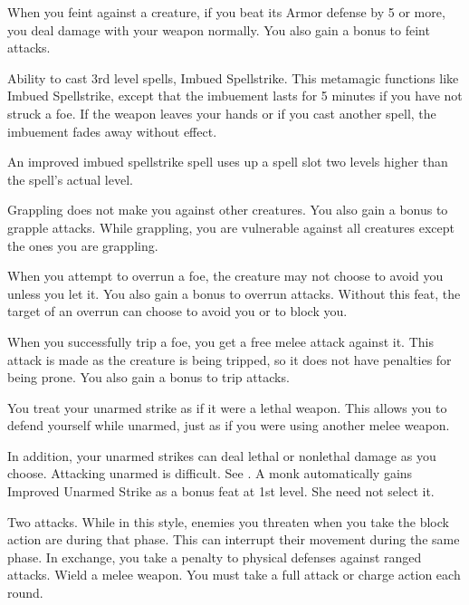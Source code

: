 \featben When you feint against a creature, if you beat its Armor defense by 5 or more, you deal damage with your weapon normally.
You also gain a  bonus to feint attacks.

\featpre Ability to cast 3rd level spells, Imbued Spellstrike.
\featben This metamagic functions like Imbued Spellstrike, except that the imbuement lasts for 5 minutes if you have not struck a foe.
If the weapon leaves your hands or if you cast another spell, the imbuement fades away without effect.

An improved imbued spellstrike spell uses up a spell slot two levels higher than the spell's actual level.

\featben Grappling does not make you \vulnerable against other creatures.
You also gain a  bonus to grapple attacks.
While grappling, you are vulnerable against all creatures except the ones you are grappling.

\featben When you attempt to overrun a foe, the creature may not choose to avoid you unless you let it.
You also gain a  bonus to overrun attacks.
Without this feat, the target of an overrun can choose to avoid you or to block you.

\featben When you successfully trip a foe, you get a free melee attack against it.
This attack is made as the creature is being tripped, so it does not have penalties for being prone.
You also gain a  bonus to trip attacks.

\featben You treat your unarmed strike as if it were a lethal weapon.
This allows you to defend yourself while unarmed, just as if you were using another melee weapon.

In addition, your unarmed strikes can deal lethal or nonlethal damage as you choose.
Attacking unarmed is difficult.
See .
A monk automatically gains Improved Unarmed Strike as a bonus feat at 1st level.
She need not select it.

\featpre Two attacks.
\featben While in this style, enemies you threaten when you take the block action are \immobilized during that phase.
This can interrupt their movement during the same phase.
In exchange, you take a  penalty to physical defenses against ranged attacks.
\stylereq Wield a melee weapon.
You must take a full attack or charge action each round.

